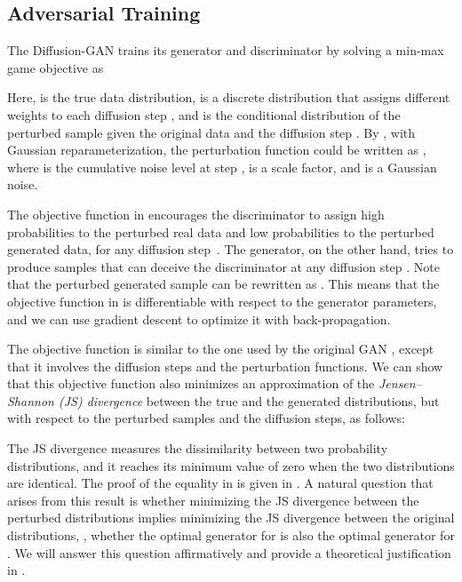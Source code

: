 \documentclass{article} \usepackage{iclr2023_conference,times}
\theoremstyle{plain}
\theoremstyle{definition}
\theoremstyle{remark}
\begin{document}
\subsection{Adversarial Training} 

The Diffusion-GAN trains its generator and discriminator by solving a min-max game objective as 

Here,  is the true data distribution,  is a discrete distribution that assigns different weights  to each diffusion step , and  is the conditional distribution of the perturbed sample  given the original data  and the diffusion step . {By , with Gaussian reparameterization, the perturbation function could be written as , where  is the cumulative noise level at step },  is a scale factor, and  is a Gaussian noise. 

The objective function in  encourages the discriminator to assign high probabilities to the perturbed real data and low probabilities to the perturbed generated data, for any diffusion step~. The generator, on the other hand, tries to produce samples that can deceive the discriminator at any diffusion step . Note that the perturbed generated sample  can be rewritten as . This means that the objective function in  is differentiable with respect to the generator parameters, and we can use gradient descent to optimize it with back-propagation.



The objective function  is similar to the one used by the original GAN \citep{goodfellow2014generative}, except that it involves the diffusion steps and the perturbation functions. We can show that this objective function also minimizes an approximation of the \textit{Jensen--Shannon (JS) divergence} between the true and the generated distributions, but with respect to the perturbed samples and the diffusion steps, as follows:

The JS divergence measures the dissimilarity between two probability distributions, and it reaches its minimum value of zero when the two distributions are identical. The proof of the equality in  is given in . A natural question that arises from this result is whether minimizing the JS divergence between the perturbed distributions implies minimizing the JS divergence between the original distributions, , whether the optimal generator for  is also the optimal generator for . We will answer this question affirmatively and provide a theoretical justification in .
\end{document}
